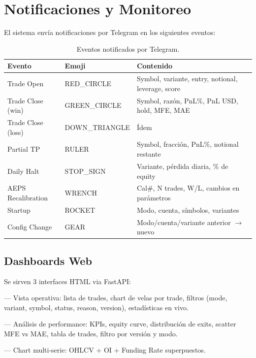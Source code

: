 \documentclass[11pt,a4paper]{article}
\newcommand{\code}[1]{\texttt{\small #1}}
\begin{document}
\section{Notificaciones y Monitoreo}
\label{sec:notifications}

El sistema env\'ia notificaciones por Telegram en los siguientes eventos:

\begin{table}[H]
\centering
\caption{Eventos notificados por Telegram.}
\begin{tabular}{lll}
\toprule
\textbf{Evento} & \textbf{Emoji} & \textbf{Contenido} \\
\midrule
Trade Open & \textsf{RED\_CIRCLE} & Symbol, variante, entry, notional, leverage, score \\
Trade Close (win) & \textsf{GREEN\_CIRCLE} & Symbol, raz\'on, PnL\%, PnL USD, hold, MFE, MAE \\
Trade Close (loss) & \textsf{DOWN\_TRIANGLE} & \'Idem \\
Partial TP & \textsf{RULER} & Symbol, fracci\'on, PnL\%, notional restante \\
Daily Halt & \textsf{STOP\_SIGN} & Variante, p\'erdida diaria, \% de equity \\
AEPS Recalibration & \textsf{WRENCH} & Cal\#, N trades, W/L, cambios en par\'ametros \\
Startup & \textsf{ROCKET} & Modo, cuenta, s\'imbolos, variantes \\
Config Change & \textsf{GEAR} & Modo/cuenta/variante anterior $\to$ nuevo \\
\bottomrule
\end{tabular}
\end{table}

\subsection{Dashboards Web}

Se sirven 3 interfaces HTML via FastAPI:
\begin{description}[leftmargin=1em]
\item[\code{/dashboard}] --- Vista operativa: lista de trades, chart de velas por trade,
  filtros (mode, variant, symbol, status, reason, version), estad\'isticas en vivo.
\item[\code{/report}] --- An\'alisis de performance: KPIs, equity curve, distribuci\'on
  de exits, scatter MFE vs MAE, tabla de trades, filtro por versi\'on y modo.
\item[\code{/chart}] --- Chart multi-serie: OHLCV + OI + Funding Rate superpuestos.
\end{description}
\end{document}
